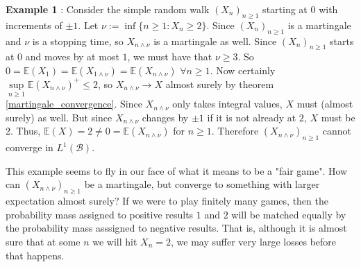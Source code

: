 \textbf{Example 1} \cite{durrett_2010}: Consider the simple random walk $(X_n)_{n \geq 1}$ starting at \(0\) with increments of \(\pm 1\). Let \(\nu := \inf\limits \{n \geq 1 : X_{n} \geq 2\}\). Since \((X_n)_{n \geq 1}\) is a martingale and \(\nu\) is a stopping time, so \(X_{n \wedge \nu}\) is a martingale as well. Since \((X_n)_{n \geq 1}\) starts at \(0\) and moves by at most \(1\), we must have that \(\nu \geq 3\). So \(0 = \mathbb{E}(X_{1}) = \mathbb{E}(X_{1 \wedge \nu}) = \mathbb{E}(X_{n \wedge \nu})\) \(\forall n \geq 1\). Now certainly \(\sup\limits_{n \geq 1} \mathbb{E}(X_{n \wedge \nu})^{+} \leq 2\), so \(X_{n \wedge \nu} \to X\) almost surely by theorem \ref{martingale_convergence}. Since \(X_{n \wedge \nu}\) only takes integral values, \(X\) must (almost surely) as well. But since \(X_{n \wedge \nu}\) changes by \(\pm 1\) if it is not already at \(2\), \(X\) must be \(2\). Thus, \(\mathbb{E}(X) = 2 \neq 0 = \mathbb{E}(X_{n \wedge \nu})\) for \(n \geq 1\). Therefore \((X_{n \wedge \nu})_{n \geq 1}\) cannot converge in \(L^{1}(\mathcal{B})\).

This example seems to fly in our face of what it means to be a "fair game". How can \((X_{n \wedge \nu})_{n \geq 1}\) be a martingale, but converge to something with larger expectation almost surely? If we were to play finitely many games, then the probability mass assigned to positive results \(1\) and \(2\) will be matched equally by the probability mass asssigned to negative results. That is, although it is almost sure that at some \(n\) we will hit \(X_{n} = 2\), we may suffer very large losses before that happens. 


